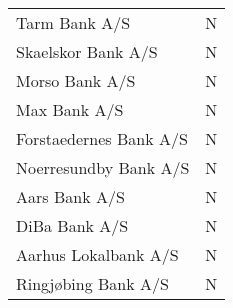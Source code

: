 \documentclass[10pt]{article} %
\begin{document}
\begin{table}[H]
{\begin{tabular}{l c}
        Tarm Bank A/S & N \\
        Skaelskor Bank A/S & N \\
        Morso Bank A/S & N \\
        Max Bank A/S & N \\
        Forstaedernes Bank A/S & N \\
        Noerresundby Bank A/S & N \\
        Aars Bank A/S & N \\
        DiBa Bank A/S & N \\
        Aarhus Lokalbank A/S & N \\
        Ringj\o bing Bank A/S & N \\
    \end{tabular}}
    \label{}
\end{table}
\newpage 

\thispagestyle{plain}
\end{document}
